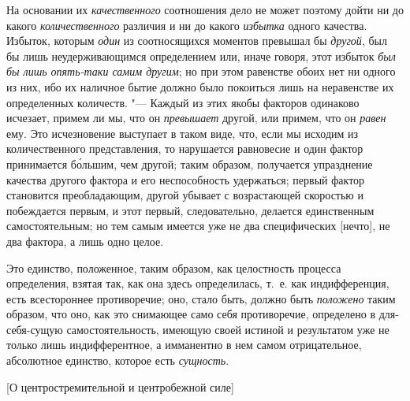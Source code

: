 На основании их {\em качественного} соотношения дело не
может поэтому дойти ни до какого {\em количественного}
различия и ни до какого {\em избытка} одного качества.
Избыток, которым {\em один} из соотносящихся моментов
превышал бы {\em другой}, был бы лишь неудерживающимся
определением или, иначе говоря, этот избыток {\em был
бы лишь опять-таки самим другим}; но при этом равенстве обоих нет ни одного
из них, ибо их наличное бытие должно было покоиться лишь на неравенстве их
определенных количеств. "--- Каждый из этих якобы факторов одинаково исчезает,
примем ли мы, что он {\em превышает} другой, или
примем, что он {\em равен} ему. Это исчезновение
выступает в таком виде, что, если мы исходим из количественного
представления, то нарушается равновесие и один фактор принимается б\'{о}льшим,
чем другой; таким образом, получается упразднение качества другого фактора
и его неспособность удержаться; первый фактор становится преобладающим,
другой убывает с возрастающей скоростью и побеждается первым, и этот
первый, следовательно, делается единственным самостоятельным; но тем самым
имеется уже не два специфических [нечто], не два фактора, а лишь одно
целое.

Это единство, положенное, таким образом, как целостность процесса
определения, взятая так, как она здесь определилась, т.~е. как
индифференция, есть всестороннее противоречие; оно, стало быть, должно быть
{\em положено} таким образом, что оно, как это
снимающее само себя противоречие, определено в для-себя-сущую
самостоятельность, имеющую своей истиной и результатом уже не только лишь
индифферентное, а имманентно в нем самом отрицательное, абсолютное единство,
которое есть {\em сущность}.

%
  {[О центростремительной и центробежной силе]}

